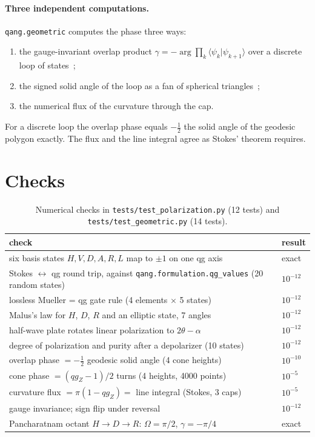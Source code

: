 \documentclass[11pt]{article}
\begin{document}
\paragraph{Three independent computations.} \texttt{qang.geometric} computes the phase three ways:
\begin{enumerate}
\item the gauge-invariant overlap product $\gamma=-\arg\prod_k\langle\psi_k|\psi_{k+1}\rangle$ over a discrete
  loop of states~\cite{samuel1988};
\item the signed solid angle of the loop as a fan of spherical triangles~\cite{vanoosterom1983};
\item the numerical flux of the curvature through the cap.
\end{enumerate}
For a discrete loop the overlap phase equals $-\tfrac12$ the solid angle of the geodesic polygon exactly. The
flux and the line integral agree as Stokes' theorem requires.

\section{Checks}

\begin{table}[h]
\centering\small
\begin{tabular}{p{}l}
\toprule
check & result\\
\midrule
six basis states $H,V,D,A,R,L$ map to $\pm1$ on one qg axis & exact\\
Stokes $\leftrightarrow$ qg round trip, against \texttt{qang.formulation.qg\_values} (20 random states) & $10^{-12}$\\
lossless Mueller = qg gate rule (4 elements $\times$ 5 states) & $10^{-12}$\\
Malus's law for $H$, $D$, $R$ and an elliptic state, 7 angles & $10^{-12}$\\
half-wave plate rotates linear polarization to $2\theta-\alpha$ & $10^{-12}$\\
degree of polarization and purity after a depolarizer (10 states) & $10^{-12}$\\
overlap phase $=-\tfrac12$ geodesic solid angle (4 cone heights) & $10^{-10}$\\
cone phase $=(qg_Z-1)/2$ turns (4 heights, 4000 points) & $10^{-5}$\\
curvature flux $=\pi(1-qg_Z)=$ line integral (Stokes, 3 caps) & $10^{-5}$\\
gauge invariance; sign flip under reversal & $10^{-12}$\\
Pancharatnam octant $H\to D\to R$: $\Omega=\pi/2$, $\gamma=-\pi/4$ & exact\\
\bottomrule
\end{tabular}
\caption{Numerical checks in \texttt{tests/test\_polarization.py} (12 tests) and \texttt{tests/test\_geometric.py}
(14 tests).}
\end{table}
\end{document}
